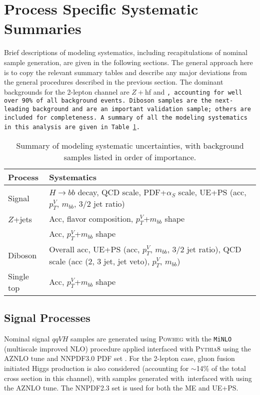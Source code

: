 \section{Process Specific Systematic Summaries}
Brief descriptions of modeling systematics, including recapitulations of nominal sample generation, are given in the following sections.  The general approach here is to copy the relevant summary tables and describe any major deviations from the general procedures described in the previous section.  The dominant backgrounds for the 2-lepton channel are $Z+$hf and \tt, accounting for well over 90\% of all background events.  Diboson samples are the next-leading background and are an important validation sample; others are included for completeness.  A summary of all the modeling systematics in this analysis are given in Table \ref{tab:modelsyssum}.  
\begin{table}[!htbp]\captionsetup{justification=centering}
  \begin{center}
    \begin{tabular}{lp{5in}}
      \hline\hline
      Process & Systematics\\
      \hline
      Signal  & $H\to bb$ decay, QCD scale, PDF+$\alpha_S$ scale, UE+PS (acc, $p_T^V$, $m_{bb}$, 3/2 jet ratio)\\
      $Z$+jets  & Acc, flavor composition, $p_T^V$+$m_{bb}$ shape\\
      \tt  & Acc, $p_T^V$+$m_{bb}$ shape\\
      Diboson  &  Overall acc, UE+PS (acc, $p_T^V$, $m_{bb}$, 3/2 jet ratio), QCD scale  (acc (2, 3 jet, jet veto), $p_T^V$, $m_{bb}$)\\
      Single top  & Acc, $p_T^V$+$m_{bb}$ shape\\
      \hline\hline
    \end{tabular}
  \end{center}
  \caption{Summary of modeling systematic uncertainties, with background samples listed in order of importance.}
  \label{tab:modelsyssum}
\end{table}

\subsection{Signal Processes}
Nominal signal $qqVH$ samples are generated using \textsc{Powheg} with the \texttt{MiNLO} (multiscale improved NLO) \cite{minlo} procedure applied interfaced with \textsc{Pythia8} using the AZNLO tune \cite{aznlo} and NNPDF3.0 PDF set \cite{nnpdf3}.  For the 2-lepton case, gluon fusion initiated Higgs production is also considered (accounting for $\sim$14\% of the total cross section in this channel), with samples generated with \powheg\,interfaced with  using the AZNLO tune.  The NNPDF2.3 set \cite{nnpdf23} is used for both the ME and UE+PS.

